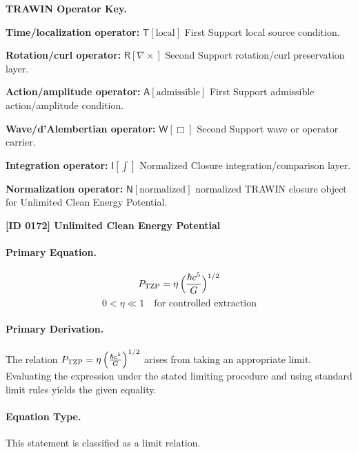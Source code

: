 \par\vspace{0.45\baselineskip}
\noindent\begin{minipage}[t]{\linewidth}
\begingroup
\small
\raggedright
\textbf{TRAWIN Operator Key.}\par
\noindent\textbf{Time/localization operator:} $\mathsf{T}\!\left[\mathrm{local}\right]$ First Support local source condition.\par
\noindent\textbf{Rotation/curl operator:} $\mathsf{R}\!\left[\nabla\times\right]$ Second Support rotation/curl preservation layer.\par
\noindent\textbf{Action/amplitude operator:} $\mathsf{A}\!\left[\mathrm{admissible}\right]$ First Support admissible action/amplitude condition.\par
\noindent\textbf{Wave/d'Alembertian operator:} $\mathsf{W}\!\left[\Box\right]$ Second Support wave or operator carrier.\par
\noindent\textbf{Integration operator:} $\mathsf{I}\!\left[\int\right]$ Normalized Closure integration/comparison layer.\par
\noindent\textbf{Normalization operator:} $\mathsf{N}\!\left[\mathrm{normalized}\right]$ normalized TRAWIN closure object for Unlimited Clean Energy Potential.\par
\endgroup
\end{minipage}

\clearpage
\noindent\textbf{[ID 0172] Unlimited Clean Energy Potential}\par
\vspace{0.35em}
\paragraph{Primary Equation.}
\[
P_{\mathrm{TZP}} = \eta\,\Bigl(\frac{\hbar c^5}{G}\Bigr)^{1/2}
\]
\[
0 < \eta \ll 1 \quad \text{for controlled extraction}
\]

\paragraph{Primary Derivation.}
The relation \( P_{\mathrm{TZP}} = \eta\,\Bigl(\frac{\hbar c^5}{G}\Bigr)^{1/2} \) arises from taking an appropriate limit. Evaluating the expression under the stated limiting procedure and using standard limit rules yields the given equality.
\paragraph{Equation Type.}
This statement is classified as a limit relation.

